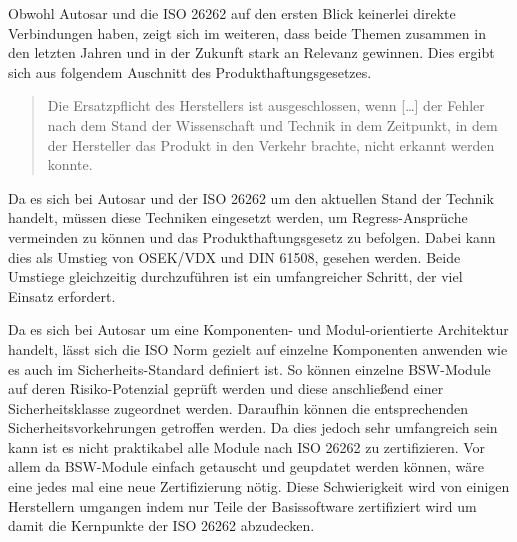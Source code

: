 \documentclass[
  a4paper,					    %
  twoside,
  DIV=calc,     				%
  bibliography=totoc,
  cleardoublepage=empty,
  ngerman,     					%
  final       					%
]{scrbook}
\begin{document}
Obwohl Autosar und die ISO 26262 auf den ersten Blick keinerlei direkte Verbindungen haben, zeigt sich im weiteren, dass beide Themen zusammen in den letzten Jahren und in der Zukunft stark an Relevanz gewinnen. Dies ergibt sich aus folgendem Auschnitt des Produkthaftungsgesetzes.


\begin{quote}
Die Ersatzpflicht des Herstellers ist ausgeschlossen, wenn [\dots] der Fehler nach dem Stand der Wissenschaft und Technik in dem Zeitpunkt, in dem der Hersteller das Produkt in den Verkehr brachte, nicht erkannt werden konnte.\cite{ProdG}
\end{quote}

Da es sich bei Autosar und der ISO 26262 um den aktuellen Stand der Technik handelt, müssen diese Techniken eingesetzt werden, um Regress-Ansprüche vermeinden zu können und das Produkthaftungsgesetz zu befolgen. Dabei kann dies als Umstieg von OSEK/VDX und DIN 61508, gesehen werden. Beide Umstiege gleichzeitig durchzuführen ist ein umfangreicher Schritt, der viel Einsatz erfordert. 

Da es sich bei Autosar um eine Komponenten- und Modul-orientierte Architektur handelt, lässt sich die ISO Norm gezielt auf einzelne Komponenten anwenden wie es auch im Sicherheits-Standard definiert ist. So können einzelne BSW-Module auf deren Risiko-Potenzial geprüft werden und diese anschließend einer Sicherheitsklasse zugeordnet werden. Daraufhin können die entsprechenden Sicherheitsvorkehrungen getroffen werden. Da dies jedoch sehr umfangreich sein kann ist es nicht praktikabel alle Module nach ISO 26262 zu zertifizieren. Vor allem da BSW-Module einfach getauscht und geupdatet werden können, wäre eine jedes mal eine neue Zertifizierung nötig. Diese Schwierigkeit wird von einigen Herstellern umgangen indem nur Teile der Basissoftware zertifiziert wird um damit die Kernpunkte der ISO 26262 abzudecken.
\end{document}
